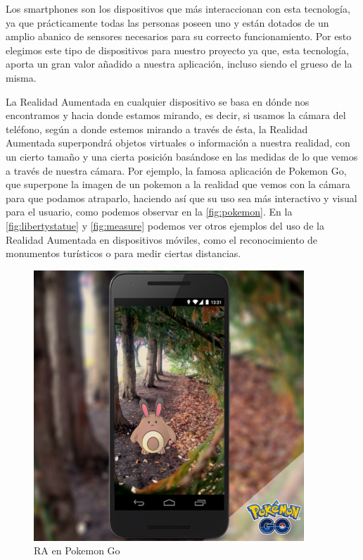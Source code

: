 Los smartphones son los dispositivos que más interaccionan con esta tecnología, ya que prácticamente todas las personas poseen uno
 y están dotados de un amplio abanico de sensores necesarios para su correcto funcionamiento. Por esto elegimos este tipo de dispositivos para nuestro
 proyecto ya que, esta tecnología, aporta un gran valor añadido a nuestra aplicación, incluso siendo el grueso de la misma. 

 La Realidad Aumentada en cualquier dispositivo se basa en dónde nos encontramos y hacia donde estamos mirando, es decir, si usamos la cámara del teléfono,
 según a donde estemos mirando a través de ésta, la Realidad Aumentada superpondrá objetos virtuales o información a nuestra realidad, con un cierto tamaño y una cierta posición
 basándose en las medidas de lo que vemos a través de nuestra cámara. Por ejemplo, la famosa aplicación de Pokemon Go, que superpone la imagen de un pokemon a la realidad
 que vemos con la cámara para que podamos atraparlo, haciendo así que su uso sea más interactivo y visual para el usuario, como podemos observar en la \autoref{fig:pokemon}. En la \autoref{fig:libertystatue} y \autoref{fig:measure}
 podemos ver otros ejemplos del uso de la Realidad Aumentada en dispositivos móviles, como el reconocimiento de monumentos turísticos o para medir ciertas distancias.

 \begin{figure}[H]
    \centering
    \includegraphics[width=4in]{figures/chapter-2/pokemongo.png}
    \caption{RA en Pokemon Go\cite{pokemongo}}
    \label{fig:pokemon}
\end{figure}

